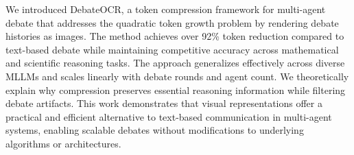 \documentclass{article}
\theoremstyle{plain}
\theoremstyle{definition}
\theoremstyle{remark}
\begin{document}
We introduced DebateOCR, a token compression framework for multi-agent debate that addresses the 
quadratic token growth problem by rendering debate histories as images. The method achieves 
over 92\% token reduction compared to text-based debate while maintaining competitive 
accuracy across mathematical and scientific reasoning tasks. The approach generalizes 
effectively across diverse MLLMs and scales linearly with debate rounds 
and agent count. We theoretically explain why compression preserves essential 
reasoning information while filtering debate artifacts. This work demonstrates that visual 
representations offer a practical and efficient alternative to text-based communication in 
multi-agent systems, enabling scalable debates without modifications to underlying algorithms 
or architectures.




\end{document}
